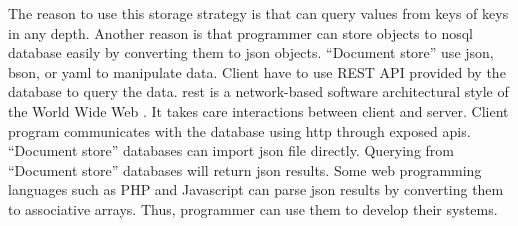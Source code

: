 The reason to use this storage strategy is that can query values from keys of keys in any depth.
Another reason is that programmer can store objects to \gls{nosql} database easily by converting them to \gls{json} objects.
\enquote{Document store} use \gls{json}, \gls{bson}, or \gls{yaml} to manipulate data.
Client have to use REST API provided by the database to query the data.
\gls{rest} is a network-based software architectural style of the World Wide Web \cite{doglio, masse_2012}.
It takes care interactions between client and server.
Client program communicates with the database using \gls{http} through exposed \glspl{api}.
\enquote{Document store} databases can import \gls{json} file directly.
Querying from \enquote{Document store} databases will return \gls{json} results.
Some web programming languages such as PHP and Javascript can parse \gls{json} results by converting them to associative arrays.
Thus, programmer can use them to develop their systems.



%

